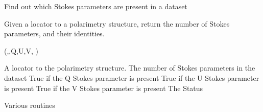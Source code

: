 \begin{manroutinedescription}
     Find out which Stokes parameters are present in a dataset

     Given a locator to a polarimetry structure, return the number
     of Stokes parameters, and their identities.

     {}

     {} {} ({},{},Q,U,V,%
{})

\begin{manparametertable}
 A locator %
to the polarimetry
                       structure.
 The number of Stokes
                       parameters in the dataset
 True if the Q Stokes parameter
                       is present
 True if the U Stokes parameter
                       is present
 True if the V Stokes parameter
                       is present
 The Status

\end{manparametertable}
     Various {} routines
\end{manroutinedescription}
